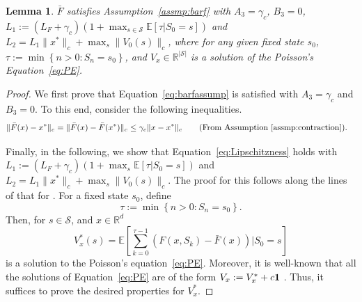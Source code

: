 \documentclass{article}
\newcommand{\lrset}[1]{\left\{ #1 \right\}}
\newcommand{\lrp}[1]{\left( #1 \right)}
\newcommand{\lrs}[1]{\left[ #1 \right]}
\newcommand{\E}[1]{\mathbb{E}\lrs{#1}}
\newcommand{\R}{\mathbb{R}}
\newcommand{\calS}{{\mathcal S}}
\newtheorem{lemma}[theorem]{Lemma}
\begin{document}
\begin{lemma}\label{lem:assmpbarf_cont}
    $\bar{F}$ satisfies Assumption~\ref{assmp:barf} with $A_3 = \gamma_c$, $B_3 = 0$, $L_1 := (L_F + \gamma_c) (1+ \max_{s\in\mathcal S} \E{\tau | S_0 = s})$ and $L_2 = L_1\|x^*\|_c + \max_s \|V_0(s)\|_c$, where for any given fixed state $s_0$, $\tau := \min\lrset{n > 0: S_n = s_0}$, and $V_x \in \R^{|\mathcal S|}$ is a solution of the Poisson's Equation~\eqref{eq:PE}.
\end{lemma}
\begin{proof}
    We first prove that Equation~\eqref{eq:barfassump} is satisfied with $A_3 = \gamma_c$ and $B_3 = 0$. To this end, consider the following inequalities. 
    \begin{align*}
        \|\bar{F}(x) - x^*\|_c 
        &= \|\bar{F}(x) - \bar{F}(x^*)\|_c \le \gamma_c \|x - x^*\|_c \tag{From Assumption~\ref{assmp:contraction}}.
    \end{align*}
    
    Finally, in the following, we show that Equation~\eqref{eq:Lipschitzness} holds with $L_1 := (L_F + \gamma_c) (1+\max_s\E{\tau | S_0 = s})$ and $L_2 = L_1\|x^*\|_c + \max_s \|V_0(s)\|_c$. The proof for this follows along the lines of that for \cite[Proposition 5.1]{haque2024stochastic}. For a fixed state $s_0$, define $$\tau := \min\lrset{n > 0: S_n = s_0}. $$ 
    Then, for $s \in \calS$, and $x\in\R^d$
    \[ V^*_x(s) = \E{\sum\limits_{k=0}^{\tau - 1} \lrp{F(x, S_k) - \bar{F}(x)} | S_0 = s} \]
    is a solution to the Poisson's equation~\eqref{eq:PE}. Moreover, it is well-known that all the solutions of Equation~\eqref{eq:PE} are of the form $V_x := V^*_x + c {\bf 1}$ \citep[Lemma 21.2.2]{douc2018markov}. Thus, it suffices to prove the desired properties for $V^*_x$.
    

\end{proof}
\end{document}
